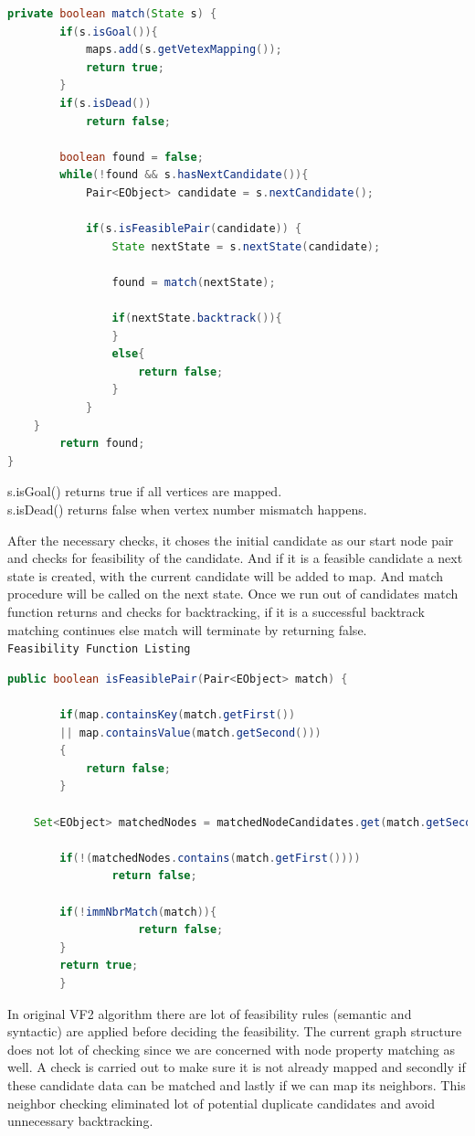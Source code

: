 \begin{lstlisting}[language = Java,frame = single]
private boolean match(State s) {
		if(s.isGoal()){
			maps.add(s.getVetexMapping());
			return true;
		}
		if(s.isDead())
			return false;
		
		boolean found = false;		
		while(!found && s.hasNextCandidate()){
			Pair<EObject> candidate = s.nextCandidate();
					
			if(s.isFeasiblePair(candidate)) {
				State nextState = s.nextState(candidate);
						
				found = match(nextState);
			
				if(nextState.backtrack()){			
				}
				else{
					return false;
				}
			}
	}
		return found;
}
\end{lstlisting}

s.isGoal() returns true if all vertices are mapped.\\
s.isDead() returns false when vertex number mismatch happens. 

After the necessary checks, it choses the initial candidate as our start node pair and checks for feasibility of the candidate. And if it is a feasible candidate a next state is created, with the current candidate will be added to map.
And match procedure will be called on the next state. Once we run out of candidates match function returns and checks for backtracking, if it is a successful backtrack matching continues else match will terminate by returning false. \\

\texttt{Feasibility Function Listing}
\begin{lstlisting}[language = Java,frame = single]
public boolean isFeasiblePair(Pair<EObject> match) {
		
		if(map.containsKey(match.getFirst()) 
		|| map.containsValue(match.getSecond()))
		{
			return false;
		}
		
	Set<EObject> matchedNodes = matchedNodeCandidates.get(match.getSecond());
		
		if(!(matchedNodes.contains(match.getFirst())))
				return false;
				
		if(!immNbrMatch(match)){
					return false;
		}
		return true;
		}		
\end{lstlisting}
In original VF2 algorithm there are lot of feasibility rules (semantic and syntactic) are applied before deciding the feasibility. The current graph structure does not lot of checking since we are concerned with node property matching as well. A check is carried out to make sure it is not already mapped and secondly if these candidate data can be matched and lastly if we can map its neighbors. This neighbor checking eliminated lot of potential duplicate candidates and avoid unnecessary backtracking.

